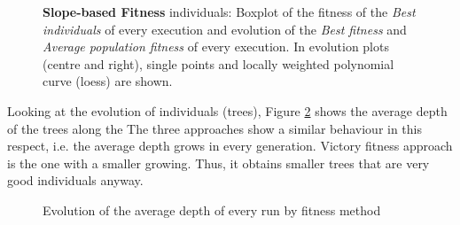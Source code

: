 \documentclass[preprint]{elsarticle}
\begin{document}
    \begin{figure}[ht]
 \begin{center}
 \end{center}
 \caption{\textbf{Slope-based Fitness} individuals: Boxplot of the fitness of the \emph{Best individuals} of every execution and evolution of the \emph{Best fitness} and \emph{Average population fitness} of every execution. In evolution plots (centre and right), single points and locally weighted polynomial curve (loess) are shown.}
 \label{figura:fitness_slope}
 \end{figure}



Looking at the evolution of individuals (trees), Figure \ref{figura:evolutionDEPTH} shows the average depth of the trees along the 
The three approaches show a similar behaviour in this respect, i.e. the average depth grows in every generation. Victory fitness approach is the one with a smaller growing. Thus, it obtains smaller trees that are very good individuals anyway.

 \begin{figure}[ht]
 \begin{center}
 \end{center}
 \caption{Evolution of the average depth of every run by fitness
   method}
 \label{figura:evolutionDEPTH}
 \end{figure}
\end{document}

